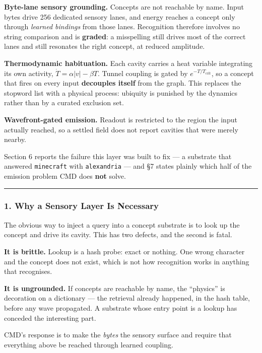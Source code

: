 \documentclass[
  11pt,
  a4paper,
]{article}
\begin{document}
\textbf{Byte-lane sensory grounding.} Concepts are not reachable by
name. Input bytes drive 256 dedicated sensory lanes, and energy reaches
a concept only through \emph{learned bindings} from those lanes.
Recognition therefore involves no string comparison and is
\textbf{graded}: a misspelling still drives most of the correct lanes
and still resonates the right concept, at reduced amplitude.

\textbf{Thermodynamic habituation.} Each cavity carries a heat variable
integrating its own activity, \(\dot{T} = \alpha|v| - \beta T\). Tunnel
coupling is gated by \(e^{-T/T_{\text{crit}}}\), so a concept that fires
on every input \textbf{decouples itself} from the graph. This replaces
the stopword list with a physical process: ubiquity is punished by the
dynamics rather than by a curated exclusion set.

\textbf{Wavefront-gated emission.} Readout is restricted to the region
the input actually reached, so a settled field does not report cavities
that were merely nearby.

Section 6 reports the failure this layer was built to fix --- a
substrate that answered \texttt{minecraft} with \texttt{alexandria} ---
and §7 states plainly which half of the emission problem CMD does
\textbf{not} solve.

\begin{center}\rule{0.5\linewidth}{0.5pt}\end{center}

\subsubsection{1. Why a Sensory Layer Is
Necessary}\label{why-a-sensory-layer-is-necessary}

The obvious way to inject a query into a concept substrate is to look up
the concept and drive its cavity. This has two defects, and the second
is fatal.

\textbf{It is brittle.} Lookup is a hash probe: exact or nothing. One
wrong character and the concept does not exist, which is not how
recognition works in anything that recognises.

\textbf{It is ungrounded.} If concepts are reachable by name, the
``physics'' is decoration on a dictionary --- the retrieval already
happened, in the hash table, before any wave propagated. A substrate
whose entry point is a lookup has conceded the interesting part.

CMD's response is to make the \emph{bytes} the sensory surface and
require that everything above be reached through learned coupling.
\end{document}

